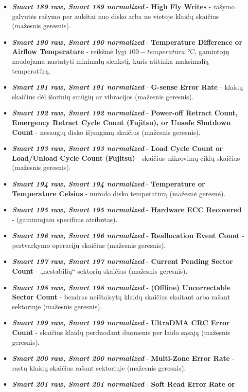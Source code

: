 \documentclass{VUMIFPSkursinis}
\begin{document}
\begin{itemize}
\item \textit{\textbf{Smart 189 raw, Smart 189 normalized}} - \textbf{High Fly Writes} - rašymo galvutės rašymo per aukštai nuo disko arba ne vietoje klaidų skaičius (mažesnis geresnis).
\item \textit{\textbf{Smart 190 raw, Smart 190 normalized}} - \textbf{Temperature Difference or Airflow Temperature} - reikšmė lygi $100-temperatūra$ °C, gamintojų naudojama nustatyti minimalų slenkstį, kuris atitinka maksimalią temperatūrą.
\item \textit{\textbf{Smart 191 raw, Smart 191 normalized}} - \textbf{G-sense Error Rate} - klaidų skaičius dėl išorinių smūgių ar vibracijos (mažesnis geresnis).
\item \textit{\textbf{Smart 192 raw, Smart 192 normalized}} - \textbf{Power-off Retract Count, Emergency Retract Cycle Count (Fujitsu), or Unsafe Shutdown Count} - nesaugių disko išjungimų skaičius (mažesnis geresnis).
\item \textit{\textbf{Smart 193 raw, Smart 193 normalized}} - \textbf{Load Cycle Count or Load/Unload Cycle Count (Fujitsu)} - skaičius užkrovimų ciklų skaičius (mažesnis geresnis).
\item \textit{\textbf{Smart 194 raw, Smart 194 normalized}} - \textbf{Temperature or Temperature Celsius} - nurodo disko temperatūrą (mažesnė geresnė).
\item \textit{\textbf{Smart 195 raw, Smart 195 normalized}} - \textbf{Hardware ECC Recovered} - (gamintojam specifinis atributas).
\item \textit{\textbf{Smart 196 raw, Smart 196 normalized}} - \textbf{Reallocation Event Count} - pertvarkymo operacijų skaičius (mažesnis geresnis).
\item \textit{\textbf{Smart 197 raw, Smart 197 normalized}} - \textbf{Current Pending Sector Count} - „nestabilių“ sektorių skaičius (mažesnis geresnis).
\item \textit{\textbf{Smart 198 raw, Smart 198 normalized}} - \textbf{(Offline) Uncorrectable Sector Count} - bendras neištaisytų klaidų skaičius skaitant arba rašant sektoriuje (mažesnis geresnis).
\item \textit{\textbf{Smart 199 raw, Smart 199 normalized}} - \textbf{UltraDMA CRC Error Count} - skaičius klaidų perduodant duomenis per laido sąsają (mažesnis geresnis).
\item \textit{\textbf{Smart 200 raw, Smart 200 normalized}} - \textbf{Multi-Zone Error Rate} - rastų klaidų skaičius rašant sektoriuje (mažesnis geresnis).
\item \textit{\textbf{Smart 201 raw, Smart 201 normalized}} - \textbf{Soft Read Error Rate or
}
\end{itemize}
\end{document}
